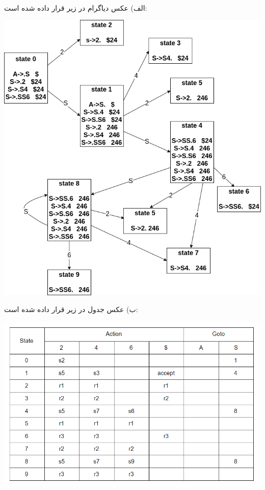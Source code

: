 \\
الف) عکس دیاگرام در زیر قرار داده شده است:
\graphicspath{{./images/}}
\begin{center}
	\includegraphics[scale=0.65]{compiler_hw2_q8.png}
\end{center}
ب) عکس جدول در زیر قرار داده شده است:
\begin{center}
	\includegraphics[scale=0.9]{compiler_hw2_q8_table.png}
\end{center}
